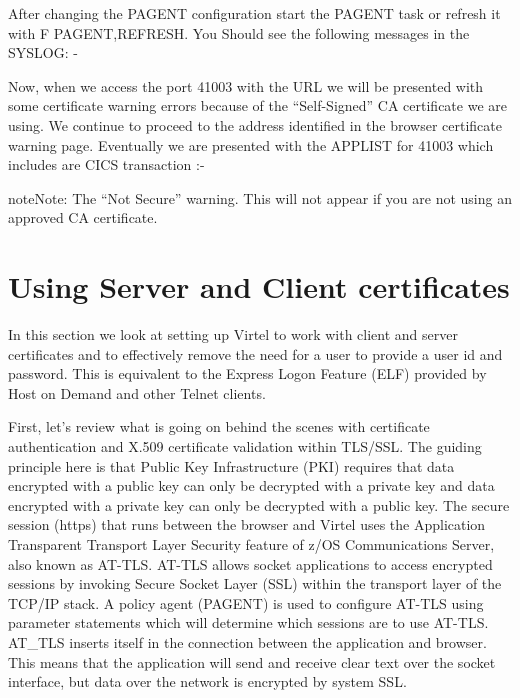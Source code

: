 \documentclass[letterpaper,10pt,english]{sphinxmanual}
\begin{document}
After changing the PAGENT configuration start the PAGENT task or refresh it with F PAGENT,REFRESH. You Should see the following messages in the SYSLOG: -

\begin{sphinxVerbatim}[commandchars=\\\{\}]
 
         
    
\end{sphinxVerbatim}

Now, when we access the port 41003 with the URL  we will be presented with some certificate warning errors because of the “Self-Signed” CA certificate we are using. We continue to proceed to the address identified in the browser certificate warning page. Eventually we are presented with the APPLIST for 41003 which includes are CICS transaction :-


\begin{sphinxadmonition}{note}{Note:}
The “Not Secure” warning. This will not appear if you are not using an approved CA certificate.
\end{sphinxadmonition}


\section{Using Server and Client certificates}
\label{\detokenize{TN202002:using-server-and-client-certificates}}
In this section we look at setting up Virtel to work with client and server certificates and to effectively remove the need for a user to provide a user id and password. This is equivalent to the Express Logon Feature (ELF) provided by Host on Demand and other Telnet clients.

First, let’s review what is going on behind the scenes with certificate authentication and X.509 certificate validation within TLS/SSL. The guiding principle here is that Public Key Infrastructure (PKI) requires that data encrypted with a public key can only be decrypted with a private key and data encrypted with a private key can only be decrypted with a public key. The secure session (https) that runs between the browser and Virtel uses the Application Transparent Transport Layer Security feature of z/OS Communications Server, also known as AT-TLS. AT-TLS allows socket
applications to access encrypted sessions by invoking Secure Socket Layer (SSL) within the transport layer of the TCP/IP stack. A policy agent (PAGENT) is used to configure AT-TLS using parameter statements which will determine which sessions are to use AT-TLS. AT\_TLS inserts itself in the connection between the application and browser. This means that the application will send
and receive clear text over the socket interface, but data over the network is encrypted by system SSL.
\end{document}
